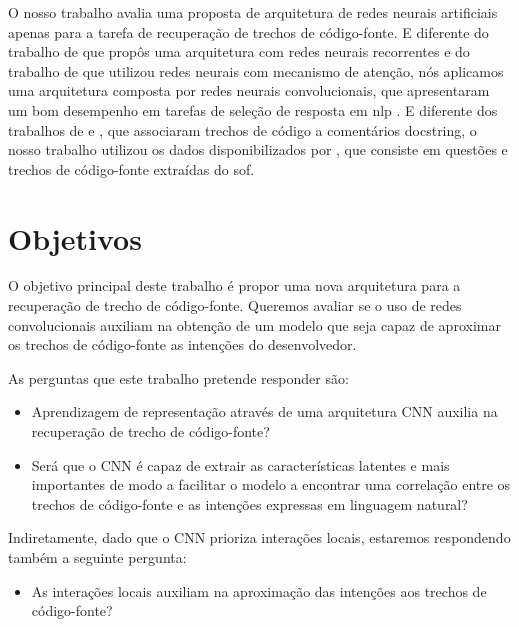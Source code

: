 O nosso trabalho avalia uma proposta de arquitetura de redes neurais artificiais apenas para a tarefa de recuperação de trechos de código-fonte. E diferente do trabalho de \cite{Gu-deep-code-search:2018} que propôs uma arquitetura com redes neurais recorrentes e do trabalho de \cite{cambronero-deep-learning-code-search:2019} que utilizou redes neurais com mecanismo de atenção, nós aplicamos uma arquitetura composta por redes neurais convolucionais, que apresentaram um bom desempenho em tarefas de seleção de resposta em \acrshort{nlp} \citep{feng-2015, tan-lstm-qa, wen-joint-modeling-question-answer-2019}. E diferente dos trabalhos de \cite{Gu-deep-code-search:2018} e \cite{cambronero-deep-learning-code-search:2019}, que associaram trechos de código a comentários \gls{docstring}, o nosso trabalho utilizou os dados disponibilizados por \cite{yao-2018}, que consiste em questões e trechos de código-fonte extraídas do \Gls{sof}.

\section{Objetivos}
\label{sec:objetivo}

O objetivo principal deste trabalho é propor uma nova arquitetura para a recuperação de trecho de código-fonte. Queremos avaliar se o uso de redes convolucionais auxiliam na obtenção de um modelo que seja capaz de aproximar os trechos de código-fonte as intenções do desenvolvedor. 

As perguntas que este trabalho pretende responder são:

\begin{itemize}
    \item Aprendizagem de representação através de uma arquitetura CNN auxilia na recuperação de trecho de código-fonte?
    
    \item Será que o CNN é capaz de extrair as características latentes e mais importantes de modo a facilitar o modelo a encontrar uma correlação entre os trechos de código-fonte e as intenções expressas em linguagem natural?
\end{itemize}

Indiretamente, dado que o CNN prioriza interações locais, estaremos respondendo também a seguinte pergunta:
\begin{itemize}
        \item As interações locais auxiliam na aproximação das intenções aos trechos de código-fonte?
\end{itemize}

